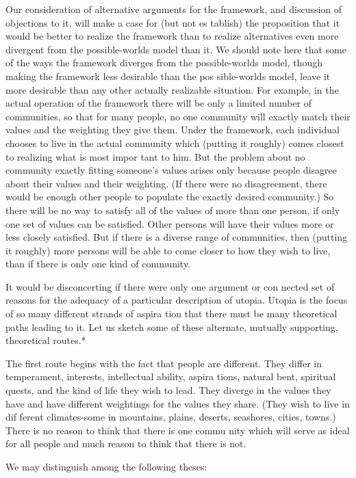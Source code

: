 \documentclass[11pt,openany]{book}
\begin{document}
Our consideration of alternative arguments for the framework, and discussion of objections to it, will make a case for (but not es tablish) the proposition that it would be better to realize the framework than to realize alternatives even more divergent from the possible-worlds model than it. We should note here that some of the ways the framework diverges from the possible-worlds model, though making the framework less desirable than the pos sible-worlds model, leave it more desirable than any other actually realizable situation. For example, in the actual operation of the framework there will be only a limited number of communities, so that for many people, no one community will exactly match their values and the weighting they give them. Under the framework, each individual chooses to live in the actual community which (putting it roughly) comes closest to realizing what is most impor tant to him. But the problem about no community exactly fitting someone's values arises only because people disagree about their values and their weighting. (If there were no disagreement, there would be enough other people to populate the exactly desired community.) So there will be no way to satisfy all of the values of more than one person, if only one set of values can be satisfied. Other persons will have their values more or less closely satisfied. But if there is a diverse range of communities, then (putting it roughly) more persons will be able to come closer to how they wish to live, than if there is only one kind of community. 

It would be disconcerting if there were only one argument or con nected set of reasons for the adequacy of a particular description of utopia. Utopia is the focus of so many different strands of aspira tion that there must be many theoretical paths leading to it. Let us sketch some of these alternate, mutually supporting, theoretical routes.* 

The first route begins with the fact that people are different. They differ in temperament, interests, intellectual ability, aspira tions, natural bent, spiritual quests, and the kind of life they wish to lead. They diverge in the values they have and have different weightings for the values they share. (They wish to live in dif ferent climates-some in mountains, plains, deserts, seashores, cities, towns.) There is no reason to think that there is one commu nity which will serve as ideal for all people and much reason to think that there is not. 

We may distinguish among the following theses: 
\end{document}
